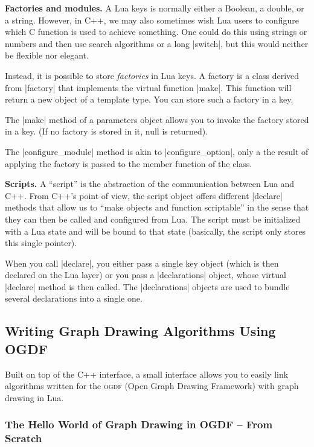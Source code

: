 \medskip
\noindent\textbf{Factories and modules.}
A Lua keys is normally either a Boolean, a double, or a
string. However, in C++, we may also sometimes wish Lua users to
configure which C function is used to achieve something. One could do
this using strings or numbers and then use search algorithms or a long
|switch|, but this would neither be flexible nor elegant.

Instead, it is possible to store \emph{factories} in Lua keys. A
factory is a class derived from |factory| that implements the virtual
function |make|. This function will return a new object of a template
type. You can store such a factory in a key.

The |make| method of a parameters object allows you to invoke the
factory stored in a key. (If no factory is stored in it, null is
returned). 

The |configure_module| method is akin to |configure_option|, only a
the result of applying the factory is passed to the member function of
the class.



\medskip
\noindent\textbf{Scripts.}
A ``script'' is the abstraction of the communication between Lua and
C++. From C++'s point of view, the script object offers different
|declare| methods that allow us to ``make objects and function
scriptable'' in the sense that they can then be called and configured
from Lua. The script must be initialized with a Lua state and will be
bound to that state (basically, the script only stores this single
pointer).

When you call |declare|, you either pass a single key object (which is
then declared on the Lua layer) or you pass a |declarations| object,
whose virtual |declare| method is then called. The |declarations|
objects are used to bundle several declarations into a single one.



\subsection{Writing Graph Drawing Algorithms Using OGDF}

\label{section-gd-ogdf-interface}

Built on top of the C++ interface, a small interface allows you to
easily link algorithms written for the \textsc{ogdf} (Open Graph
Drawing Framework) with graph drawing in Lua. 


\subsubsection{The Hello World of Graph Drawing in OGDF -- From Scratch}

